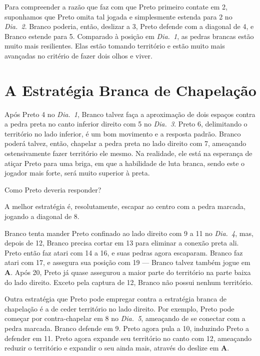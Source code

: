 Para compreender a razão que faz com que Preto primeiro contate em 2, suponhamos que Preto omita tal jogada e simplesmente estenda para 2 no \emph{Dia.\@~2}. Branco poderia, então, deslizar a 3, Preto defende com a diagonal de 4, e Branco estende para 5. Comparado à posição em \emph{Dia.\@~1}, as pedras brancas estão muito mais resilientes. Elas estão tomando território e estão muito mais avançadas no critério de fazer dois olhos e viver.

\section{A Estratégia Branca de Chapelação}

Após Preto 4 no \emph{Dia.\@~1}, Branco talvez faça a aproximação de dois espaços contra a pedra preta no canto inferior direito com 5 no \emph{Dia.\@~3}. Preto 6, delimitando o território no lado inferior, é um bom movimento e a resposta padrão. Branco poderá talvez, então, chapelar a pedra preta no lado direito com 7, ameaçando ostensivamente fazer território ele mesmo. Na realidade, ele está na esperança de atiçar Preto para uma briga, em que a habilidade de luta branca, sendo este o jogador mais forte, será muito superior à preta.

Como Preto deveria responder?

A melhor estratégia é, resolutamente, escapar ao centro com a pedra marcada, jogando a diagonal de 8.

Branco tenta mander Preto confinado ao lado direito com 9 a 11 no \emph{Dia.\@~4}, mas, depois de 12, Branco precisa cortar em 13 para eliminar a conexão preta ali. Preto então faz atari com 14 a 16, e suas pedras agora escaparam. Branco faz atari com 17, e assegura sua posição com 19 --- Branco talvez também jogue em \textbf{A}. Após 20, Preto já quase assegurou a maior parte do território na parte baixa do lado direito. Exceto pela captura de 12, Branco não possui nenhum território.

\bigskip

Outra estratégia que Preto pode empregar contra a estratégia branca de chapelação é a de ceder território no lado direito. Por exemplo, Preto pode começar por contra-chapelar em 8 no \emph{Dia.\@~5}, ameaçando de se conectar com a pedra marcada. Branco defende em 9. Preto agora pula a 10, induzindo Preto a defender em 11. Preto agora expande seu território no canto com 12, ameaçando reduzir o território e expandir o seu ainda mais, através do deslize em \textbf{A}.


